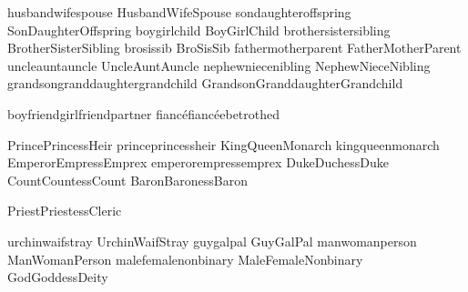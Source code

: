 \mfornb{\spouse}	{husband}{wife}{spouse}
\mfornb{\Spouse}	{Husband}{Wife}{Spouse}
\mfornb{\offspring}	{son}{daughter}{offspring}
\mfornb{\Offspring}	{Son}{Daughter}{Offspring}
\mfornb{\child}		{boy}{girl}{child}
\mfornb{\Child}		{Boy}{Girl}{Child}
\mfornb{\sibling}	{brother}{sister}{sibling}
\mfornb{\Sibling}	{Brother}{Sister}{Sibling}
\mfornb{\sib} {bro}{sis}{sib}
\mfornb{\Sib} {Bro}{Sis}{Sib}
\mfornb{\parent}	{father}{mother}{parent}
\def\grandparent{grand\parent}
\def\Grandparent{Grand\parent}
\mfornb{\Parent}	{Father}{Mother}{Parent}
\mfornb{\auncle}	{uncle}{aunt}{auncle}
\mfornb{\Auncle}	{Uncle}{Aunt}{Auncle}
\mfornb{\nibling}	{nephew}{niece}{nibling}
\mfornb{\Nibling}	{Nephew}{Niece}{Nibling}
\mfornb{\grandchild} {grandson}{granddaughter}{grandchild}
\mfornb{\Grandchild} {Grandson}{Granddaughter}{Grandchild}

\mfornb{\partner}	{boyfriend}{girlfriend}{partner}
\mfornb{\betrothed} {fianc\'e}{fianc\'ee}{betrothed}

\mfornb{\Heir}		{Prince}{Princess}{Heir}
\mfornb{\heir}		{prince}{princess}{heir}
\mfornb{\Monarch}		{King}{Queen}{Monarch}
\mfornb{\monarch}		{king}{queen}{monarch}
\mfornb{\Emperor}		{Emperor}{Empress}{Emprex}
\mfornb{\emperor}		{emperor}{empress}{emprex}
\mfornb{\Duke} 		{Duke}{Duchess}{Duke}
\mfornb{\Count}		{Count}{Countess}{Count}
\mfornb{\Baron}		{Baron}{Baroness}{Baron}

\mfornb{\Cleric}		{Priest}{Priestess}{Cleric}

\mfornb{\stray}	{urchin}{waif}{stray}
\mfornb{\Stray}	{Urchin}{Waif}{Stray}
\mfornb{\pal}		{guy}{gal}{pal}
\mfornb{\Pal}		{Guy}{Gal}{Pal}
\mfornb{\person}	{man}{woman}{person}
\mfornb{\Person}	{Man}{Woman}{Person}
\mfornb{\sex}		{male}{female}{nonbinary}
\mfornb{\Sex}		{Male}{Female}{Nonbinary}
\mfornb{\Deity}		{God}{Goddess}{Deity}
\def\God{\Deity}



